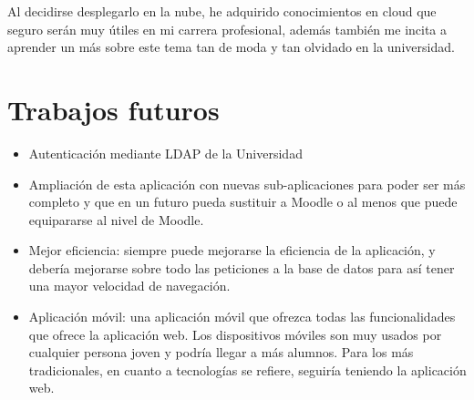 Al decidirse desplegarlo en la nube, he adquirido conocimientos en cloud que seguro serán muy útiles en mi carrera profesional, además también me incita a aprender un más sobre este tema tan de moda y tan olvidado en la universidad. 



\section{Trabajos futuros} 
\label{sec:futuro}


\begin{itemize}
\item Autenticación mediante LDAP de la Universidad
\item Ampliación de esta aplicación con nuevas sub-aplicaciones para poder ser más completo y que en un futuro pueda sustituir a Moodle o al menos que puede equipararse al nivel de Moodle.
\item Mejor eficiencia: siempre puede mejorarse la eficiencia de la aplicación, y debería mejorarse sobre todo las peticiones a la base de datos para así tener una mayor velocidad de navegación. 
\item Aplicación móvil: una aplicación móvil que ofrezca todas las funcionalidades que ofrece la aplicación web. Los dispositivos móviles son muy usados por cualquier persona joven y podría llegar a más alumnos. Para los más tradicionales, en cuanto a tecnologías se refiere, seguiría teniendo la aplicación web.
\end{itemize}
